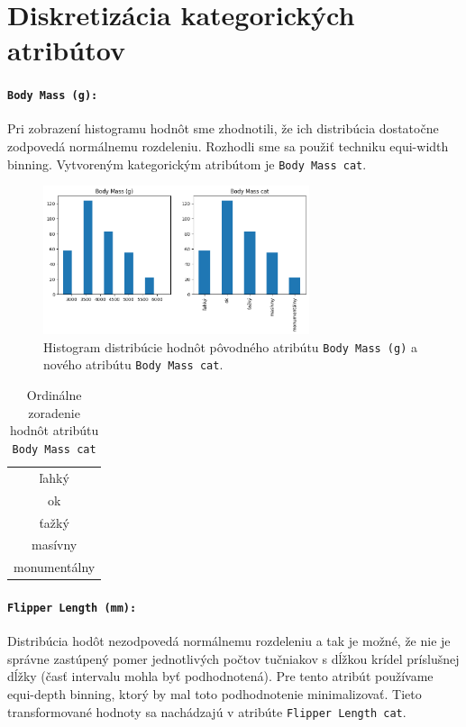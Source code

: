 \documentclass[10pt,xcolor=pdflatex,dvipsnames,table,oneside]{book}
\begin{document}
\section*{Diskretizácia kategorických atribútov}
\paragraph{\texttt{Body Mass (g):}} Pri zobrazení histogramu hodnôt sme zhodnotili, že ich distribúcia dostatočne zodpovedá normálnemu rozdeleniu. Rozhodli sme sa použiť techniku equi-width binning. Vytvoreným kategorickým atribútom je \texttt{Body~Mass~cat}. 

\begin{figure}[h]
  \centering
  \includegraphics[width=7.8cm]{img/body_mass.png}
  \caption{Histogram distribúcie hodnôt pôvodného atribútu \texttt{Body Mass (g)} a nového atribútu \texttt{Body~Mass~cat}.}
\end{figure}

\begin{table}[h]
\centering
\begin{tabular}{|c|}
\hline
ľahký                               \\
ok                                  \\
ťažký                               \\
masívny                             \\
monumentálny                        \\ \hline
\end{tabular}
\caption{Ordinálne zoradenie hodnôt atribútu \texttt{Body~Mass~cat}}
\end{table}


\paragraph{\texttt{Flipper Length (mm):}} Distribúcia hodôt nezodpovedá normálnemu rozdeleniu a tak je možné, že nie je správne zastúpený pomer jednotlivých počtov tučniakov s dĺžkou krídel príslušnej dĺžky (časť intervalu mohla byť podhodnotená). Pre tento atribút používame equi-depth binning, ktorý by mal toto podhodnotenie minimalizovať. Tieto transformované hodnoty sa nachádzajú v atribúte \texttt{Flipper Length cat}.
\end{document}
